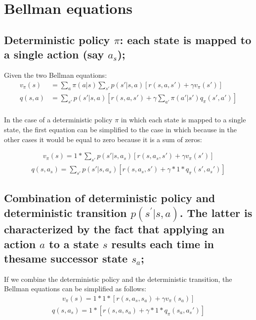 \section{Bellman equations}

\subsection{Deterministic policy $\pi$: each state is mapped to a single action (say $a_s$);}
Given the two Bellman equations:
\begin{align*}
    v_\pi(s)&=\sum\limits_{a}\pi(a|s)\sum\limits_{s'}p(s'|s,a)\left[r(s,a,s')+\gamma v_\pi(s')\right]\\
    q(s, a)&=\sum\limits_{s'}p(s'|s,a)\left[r(s, a, s')+\gamma\sum\limits_{a'}\pi(a'|s')q_\pi(s',a')\right]\\
\end{align*}


In the case of a deterministic policy $\pi$ in which each state is mapped to a single state, the first equation can be
simplified to the case in which  because in the other cases it would be equal to zero because it
is a sum of zeros:

\begin{align*}
    v_\pi(s)=1*\sum\limits_{s'}p(s'|s,a_s)\left[r(s,a_s,s')+\gamma v_\pi(s')\right]
\end{align*}
\begin{align*}
    q(s, a_s)=\sum\limits_{s'}p(s'|s,a_s)\left[r(s, a_s, s')+\gamma * 1 * q_\pi(s',a_{s}')\right]
\end{align*}

\subsection{Combination of deterministic policy and deterministic transition $p(s^{'}|s,a)$. The latter is characterized
by
the fact that applying an action $a$ to a state $s$ results each time in thesame successor state $s_a$;}
If we combine the deterministic policy and the deterministic transition, the Bellman equations can be simplified as follows:
\begin{align*}
    v_\pi(s)=1*1*\left[r(s,a_s,s_a)+\gamma v_\pi(s_a)\right]
\end{align*}
\begin{align*}
    q(s, a_s)=1*\left[r(s, a, s_a)+\gamma * 1 * q_\pi(s_a,a_{s}')\right]
\end{align*}